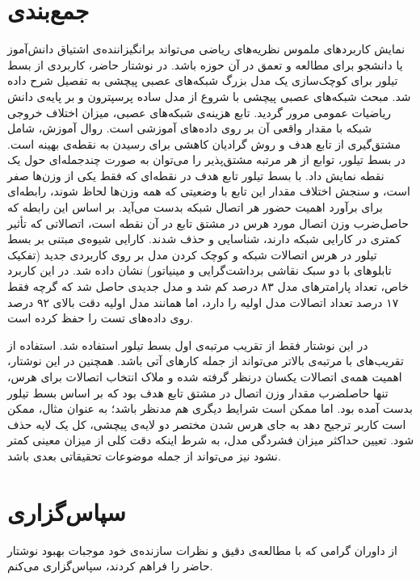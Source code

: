 \documentclass[11pt, twoside]{imsproc}
\begin{document}
\section{جمع‌بندی}
نمایش کاربردهای ملموس نظریه‌های ریاضی می‌تواند برانگیزاننده‌ی اشتیاق دانش‌آموز یا دانشجو برای مطالعه و تعمق در آن حوزه باشد.
در نوشتار حاضر، کاربردی از بسط تیلور برای کوچک‌سازی یک مدل بزرگ شبکه‌های عصبی پیچشی به تفصیل شرح داده شد.
مبحث شبکه‌های عصبی پیچشی با شروع از مدل ساده پرسپترون و بر پایه‌ی دانش ریاضیات عمومی مرور گردید.
تابع هزینه‌ی شبکه‌های عصبی، میزان اختلاف خروجی شبکه با مقدار واقعی آن بر روی داده‌های آموزشی است.
روال آموزش، شامل مشتق‌گیری از تابع هدف و روش گرادیان کاهشی برای رسیدن به نقطه‌ی بهینه است.
در بسط تیلور، توابع از هر مرتبه مشتق‌پذیر را می‌توان به صورت چندجمله‌ای حول یک نقطه نمایش داد.
با بسط تیلور تابع هدف در نقطه‌ای که فقط یکی از وزن‌ها صفر است، و سنجش اختلاف مقدار این تابع با وضعیتی که همه وزن‌ها لحاظ شوند، رابطه‌ای برای برآورد اهمیت حضور هر اتصال شبکه بدست می‌آید. بر اساس این رابطه که حاصل‌ضرب وزن اتصال مورد هرس در مشتق تابع در آن نقطه است، اتصالاتی که تأثیر کمتری در کارایی شبکه دارند، شناسایی و حذف شدند.
کارایی شیوه‌ی مبتنی بر بسط تیلور در هرس اتصالات شبکه و کوچک کردن مدل بر روی کاربردی جدید (تفکیک تابلوهای با دو سبک نقاشی برداشت‌گرایی و مینیاتور) نشان داده شد.
در این کاربرد خاص،‌ تعداد پارامترهای مدل ۸۳ درصد کم شد و مدل جدیدی حاصل شد که گرچه فقط  ۱۷ درصد تعداد اتصالات مدل اولیه را دارد، اما همانند مدل اولیه دقت بالای ۹۲ درصد روی داده‌های تست را حفظ کرده است.

در این نوشتار فقط از تقریب مرتبه‌ی اول بسط تیلور استفاده شد. استفاده از تقریب‌های با مرتبه‌ی بالاتر می‌تواند از جمله کارهای آتی باشد. همچنین در این نوشتار، اهمیت همه‌ی اتصالات یکسان درنظر گرفته شده  و ملاک انتخاب اتصالات برای هرس، تنها حاصلضرب مقدار وزن اتصال در مشتق تابع هدف  بود که بر اساس بسط تیلور بدست آمده بود. اما ممکن است شرایط دیگری هم مدنظر باشد؛ به عنوان مثال، ممکن است کاربر ترجیح دهد به جای هرس شدن مختصر دو لایه‌ی پیچشی، کل یک لایه حذف شود.
تعیین حداکثر میزان فشردگی مدل، به شرط اینکه دقت کلی از میزان معینی کمتر نشود نیز می‌تواند از جمله موضوعات تحقیقاتی بعدی باشد.


\section*{سپاس‌گزاری}
از داوران گرامی که با مطالعه‌ی دقیق و نظرات سازنده‌ی خود موجبات بهبود نوشتار حاضر را فراهم کردند، سپاس‌گزاری می‌کنم.
\end{document}

